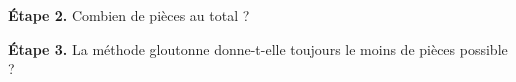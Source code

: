 \bigskip

\textbf{Étape 2.} Combien de pièces au total ?

\medskip
\dotfill

\bigskip

\textbf{Étape 3.} La méthode gloutonne donne-t-elle toujours le moins de pièces
possible ?

\medskip
\begin{center}
 \qquad {}
\end{center}
